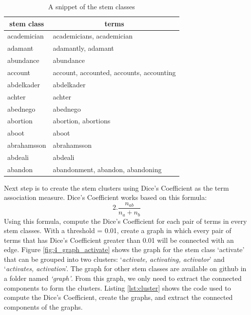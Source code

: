 \documentclass[letterpaper,11pt]{article}
\begin{document}
\begin{table}[H]
\centering
\begin{tabular}{|l|l|}
\hline
\multicolumn{1}{|c|}{\textbf{stem class}} & \multicolumn{1}{c|}{\textbf{terms}}      \\ \hline
academician                          & academicians, academician                \\ \hline
adamant                              & adamantly, adamant                       \\ \hline
abundance                            & abundance                                \\ \hline
account                              & account, accounted, accounts, accounting \\ \hline
abdelkader                           & abdelkader                               \\ \hline
achter                               & achter                                   \\ \hline
abednego                             & abednego                                 \\ \hline
abortion                             & abortion, abortions                      \\ \hline
aboot                                & aboot                                    \\ \hline
abrahamsson                          & abrahamsson                              \\ \hline
abdeali                              & abdeali                                  \\ \hline
abandon                              & abandonment, abandon, abandoning         \\ \hline
\end{tabular}
\caption{A snippet of the stem classes}
\label{tab:stem-class}
\end{table}
 
Next step is to create the stem clusters using Dice's Coefficient \cite{dice} as the term association measure. Dice's Coefficient works based on this formula: \[ 2.\frac{n_{ab}}{n_{a} + n_{b}} \]      
Using this formula, compute the Dice's Coefficient for each pair of terms in every stem classes. With a threshold = 0.01, create a graph in which every pair of terms that has Dice's Coefficient greater than 0.01 will be connected with an edge. Figure \ref{fig:4_graph_activate} shows the graph for the stem class `activate' that can be grouped into two clusters: `\textit{activate, activating, activator}' and `\textit{activates, activation}'. The graph for other stem classes are available on github in a folder named \textit{`graph'}. From this graph, we only need to extract the connected components to form the clusters. \newline
Listing \ref{lst:cluster} shows the code used to compute the Dice's Coefficient, create the graphs, and extract the connected components of the graphs. 
\end{document}
